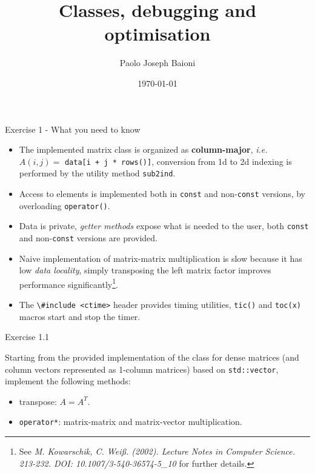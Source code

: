 \documentclass[10pt]{beamer}
\begin{document}
    \title{Classes, debugging and optimisation}
    \author{Paolo Joseph Baioni}
    \date{\today}

\begin{frame}
    \maketitle
\end{frame}

\begin{frame}{Exercise 1 - What you need to know}
\begin{itemize}
\item The implemented matrix class is organized as
      \textbf{column-major}, \textit{i.e.}
      $A(i, j) = $ \lstinline{data[i + j * rows()]}, 
      conversion from 1d to 2d indexing is performed by the utility
      method \lstinline{sub2ind}.\\[3mm]
\item Access to elements is implemented both in \texttt{const} and non-\texttt{const} versions, by overloading \lstinline{operator()}. \\[3mm]
\item Data is private, \textit{getter methods} expose what is needed to the user, both \texttt{const} and non-\texttt{const} versions are provided. \\[3mm]
\item Naive implementation of matrix-matrix multiplication is slow because it has low \textit{data locality}, simply transposing the left matrix factor improves performance significantly\footnote{See \textit{M. Kowarschik, C. Weiß. (2002). Lecture Notes in Computer Science. 213-232. DOI: 10.1007/3-540-36574-5\_10} for further details.}.\\[3mm]
\item The \lstinline{\#include <ctime>} header provides timing utilities, \lstinline{tic()} and \lstinline{toc(x)} macros start and stop the timer.
\end{itemize}
\end{frame}

\begin{frame}{Exercise 1.1}

Starting from the provided implementation of the class for dense matrices (and column vectors represented as 1-column matrices) based on \lstinline{std::vector}, implement the following methods:
\begin{itemize}
\item transpose: $A = A^{T}$.
\item \lstinline{operator*}: matrix-matrix and matrix-vector multiplication.
\end{itemize}
\end{frame}
\end{document}
